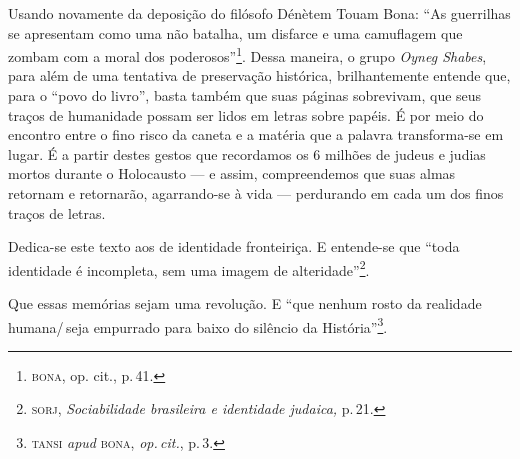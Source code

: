 
Usando novamente da deposição do filósofo Dénètem Touam Bona: ``As
guerrilhas se apresentam como uma não batalha, um disfarce e uma
camuflagem que zombam com a moral dos poderosos''\footnote{\textsc{bona}, op.
  cit., p.\,41.}. Dessa maneira, o grupo \emph{Oyneg Shabes}, para além
de uma tentativa de preservação histórica, brilhantemente entende que,
para o ``povo do livro'', basta também que suas páginas
sobrevivam, que seus traços de humanidade possam ser lidos em letras
sobre papéis. É por meio do encontro entre o fino risco da caneta e a
matéria que a palavra transforma-se em lugar. É a partir destes gestos
que recordamos os 6 milhões de judeus e judias mortos durante o
Holocausto --- e assim, compreendemos que suas almas retornam e
retornarão, agarrando-se à vida --- perdurando em cada um dos finos
traços de letras.

Dedica-se este texto aos de identidade fronteiriça. E entende-se que
``toda identidade é incompleta, sem uma imagem de
alteridade''\footnote{\textsc{sorj}, \emph{Sociabilidade brasileira e identidade
  judaica,} p.\,21.}.

Que essas memórias sejam uma revolução. E ``que nenhum rosto da
realidade humana/\,seja empurrado para baixo do silêncio da
História''\footnote{\textsc{tansi} \emph{apud} \textsc{bona}, \emph{op.\,cit.}, p.\,3.}.




